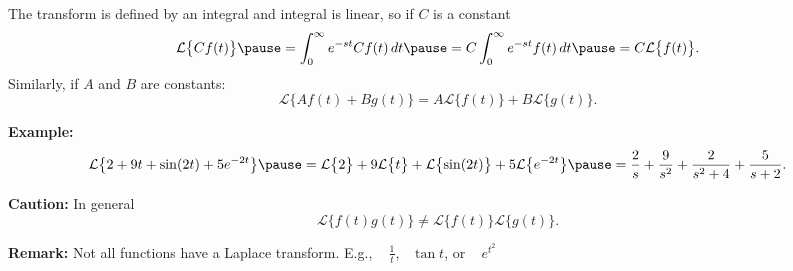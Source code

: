 \documentclass[10pt,aspectratio=169]{beamer}
\begin{document}
\begin{frame}
The transform is defined by an integral and integral is linear, so
if $C$ is a constant
\begin{equation*}
\mathcal{L} \bigl\{ C f(t) \bigr\}
\pause
=
\int_0^\infty e^{-st} C f(t) \,dt
\pause
=
C \int_0^\infty e^{-st} f(t) \,dt
\pause
=
C \mathcal{L} \bigl\{ f(t) \bigr\} .
\end{equation*}
\pause
Similarly, if $A$ and $B$ are constants:
\begin{equation*}
\mathcal{L} \bigl\{ A f(t) + B g(t) \bigr\} =
A \mathcal{L} \bigl\{ f(t) \bigr\} +
B \mathcal{L} \bigl\{ g(t) \bigr\} .
\end{equation*}


\medskip
\pause

\textbf{Example:}
\[
\mathcal{L} \bigl\{
2 + 9t + \sin(2t) + 5 e^{-2t}
\bigr\}
\pause
=
\mathcal{L} \bigl\{
2
\bigr\}
+ 9
\mathcal{L} \bigl\{
t
\bigr\}
+
\mathcal{L} \bigl\{
\sin(2t)
\bigr\}
+ 5
\mathcal{L} \bigl\{
e^{-2t}
\bigr\}
\pause
=
\frac{2}{s}
+
\frac{9}{s^2}
+
\frac{2}{s^2+4}
+
\frac{5}{s+2} .
\]
\pause

\textbf{Caution:}
In general 
\begin{equation*}
\mathcal{L} \bigl\{ f(t) g(t) \bigr\} \neq
\mathcal{L} \bigl\{ f(t) \bigr\}
\mathcal{L} \bigl\{ g(t) \bigr\} .
\end{equation*}

\medskip
\pause

\textbf{Remark:}
Not all functions have a Laplace transform. \quad E.g.,
~
$\frac{1}{t}$, ~$\tan t$, or ~ $e^{t^2}$

\end{frame}
\end{document}
